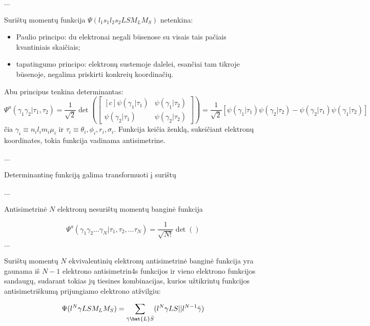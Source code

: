...

Surištų momentų funkcija $\Psi(l_1 s_1 l_2 s_2 L S M_L M_S)$ netenkina:
\begin{itemize}
    \item Paulio principo: du elektronai negali būsenose su visais tais pačiais kvantiniais skaičiais;
    \item tapatingumo principo: elektronų sustemoje dalelei, esančiai tam tikroje būsenoje, negalima priskirti konkreių koordinačių.
\end{itemize}

Abu principus tenkina determinantas:
\begin{equation*}
    \Psi^a(\gamma_1 \gamma_2 | \tau_1, \tau_2) = \frac{1}{\sqrt{2}}
    \det \left( 
    \begin{bmatrix*}[c]
        \psi(\gamma_1 | \tau_1) & \psi(\gamma_1 | \tau_2) \\
        \psi(\gamma_2 | \tau_1) & \psi(\gamma_2 | \tau_2)
    \end{bmatrix*}
    \right) = \frac{1}{\sqrt{2}} [\psi(\gamma_1 | \tau_1) \psi(\gamma_2 | \tau_2) - \psi(\gamma_2 | \tau_1) \psi(\gamma_1 | \tau_2)]
\end{equation*}
čia $\gamma_i \equiv n_i l_i m_i \mu_i$ ir $\tau_i \equiv \theta_i, \phi_i, r_i, \sigma_i$. Funkcija keičia ženklą, sukeičiant elektronų koordinates, tokia funkcija vadinama antisimetrine.

...

Determinantinę funkciją galima transformuoti į surištų

...

Antisimetrinė $N$ elektronų nesurištų momentų banginė funkcija

\begin{equation*}
    \Psi^{a} (\gamma_1 \gamma_2 \dots \gamma_N | \tau_1, \tau_2, \dots \tau_N) = 

    \frac{1}{\sqrt{N!}} \det \left(  \right)
\end{equation*}
...

Surištų momentų $N$ ekvivalentinių elektronų antisimetrinė banginė funkcija yra gaunama iš $N-1$ elektrono antisimetrin4s funkcijos ir vieno elektrono funkcijos sandaugų, sudarant tokias jų tiesines kombinacijas, kurios užtikrintų funkcijos antisimetriškumą prijungiamo elektrono atžvilgiu:

\begin{equation*}
    \Psi( l^N \gamma LSM_LM_S) = \sum_{\bar{\gamma} \bat{L} \bar{S}} (l^N \gamma L S || l^{N-1} \bar{\gamma} )
\end{equation*}

